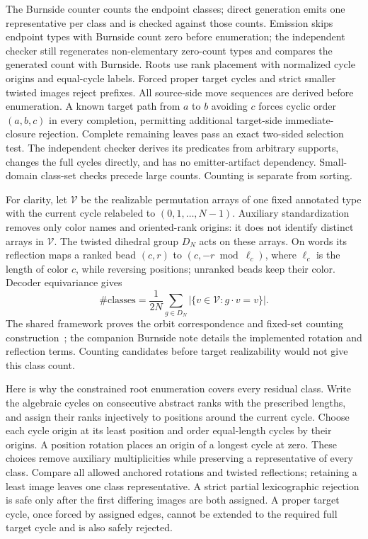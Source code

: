 \documentclass[11pt,a4paper]{article}
\begin{document}
The Burnside counter counts the endpoint classes; direct generation emits one
representative per class and is checked against those counts. Emission skips
endpoint types with Burnside count zero before enumeration; the independent
checker still regenerates non-elementary zero-count types and compares the
generated count with Burnside. Roots use rank
placement with normalized cycle origins and equal-cycle labels. Forced proper
target cycles and strict smaller twisted images reject prefixes. All
source-side move sequences are derived before enumeration. A known target path
from $a$ to $b$ avoiding $c$ forces cyclic order $(a,b,c)$ in every completion,
permitting additional target-side immediate-closure rejection. Complete remaining
leaves pass an exact two-sided selection test. The independent checker derives
its predicates from arbitrary supports, changes the full cycles directly, and
has no emitter-artifact dependency. Small-domain class-set checks precede large
counts. Counting is separate from sorting.


For clarity, let $\mathcal V$ be the realizable permutation arrays of one
fixed annotated type with the current cycle relabeled to
$(0,1,\ldots,N-1)$. Auxiliary standardization removes only color names and
oriented-rank origins: it does not identify distinct arrays in $\mathcal V$.
The twisted dihedral group $D_N$ acts on these arrays. On words its reflection
maps a ranked bead $(c,r)$ to $(c,-r\bmod\ell_c)$, where $\ell_c$ is
the length of color $c$, while reversing positions;
unranked beads keep their color. Decoder equivariance gives
\[
 \#\text{classes}=\frac{1}{2N}\sum_{g\in D_N}
       |\{v\in\mathcal V:g\cdot v=v\}|.
\]
The shared framework proves the orbit correspondence and fixed-set counting
construction~\cite{framework}; the companion Burnside note details the
implemented rotation and reflection terms. Counting candidates before target
realizability would not give this class count.

Here is why the constrained root enumeration covers every residual class.
Write the algebraic cycles on consecutive abstract ranks with the prescribed
lengths, and assign their ranks injectively to positions around the current
cycle. Choose each cycle origin at its least position and order equal-length
cycles by their origins. A position rotation places an origin of a longest
cycle at zero. These choices remove auxiliary multiplicities while preserving
a representative of every class. Compare all allowed anchored rotations and
twisted reflections; retaining a least image leaves one class representative.
A strict partial lexicographic rejection is safe only after the first differing
images are both assigned. A proper target cycle, once forced by assigned edges,
cannot be extended to the required full target cycle and is also safely rejected.
\end{document}
